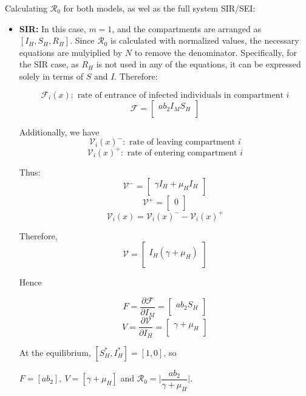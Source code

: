 \documentclass[a4paper,fleqn]{cas-dc}
\begin{document}
Calculating $\mathcal{R}_0$ for both models, as wel as the full system SIR/SEI:

\begin{itemize}
\item \textbf{SIR:}
In this case, $m=1$, and the compartments are arranged as $[I_H, S_H, R_H]$. Since $\mathcal{R}_0$ is calculated with normalized values, the necessary equations are mulyiplied by $N$ to remove the denominator. Specifically, for the SIR case, as $R_H$ is not used in any of the equations, it can be expressed solely in terms of $S$ and $I$. Therefore:

$$ {\mathcal F}_i(x): \text{ rate of entrance of infected 
individuals in compartment } i $$
$$ {\mathcal F} =\begin{bmatrix}
a  b_2  I_M  S_H \\
\end{bmatrix} $$

Additionally, we have
$$ {\mathcal V}_i(x)^-: \text{ rate of leaving compartment } i $$
$$ {\mathcal V}_i(x)^+: \text{ rate of entering compartment } i $$

Thus:
$$
{\mathcal V^-} = \begin{bmatrix}
\gamma I_H + \mu_H I_H\\
\end{bmatrix}
$$
$$
{\mathcal V^+} = \begin{bmatrix}
0\\
\end{bmatrix}
$$
$${\mathcal V}_i (x) = {\mathcal V}_i(x)^{-} - {\mathcal V}_i(x)^+$$

Therefore,
$$
{\mathcal V} =
\begin{bmatrix}
I_H (\gamma + \mu_H) \\
\end{bmatrix}
$$

Hence

$$ F = \dfrac{\partial{\mathcal F}}{\partial I_M} =\begin{bmatrix}
a  b_2  S_H \\
\end{bmatrix} $$
$$ V = \dfrac{\partial{\mathcal V}}{\partial I_H} =\begin{bmatrix}
\gamma + \mu_H\\
\end{bmatrix} $$

At the equilibrium, $[S_H^*, I_H^*] = [1,0]$, so

$F=[a  b_2], \ V = [\gamma+\mu_H]$ and $\mathcal{R}_0 = \Big | \dfrac{ab_2}{\gamma+\mu_H}\Big | $.


\end{itemize}
\end{document}
